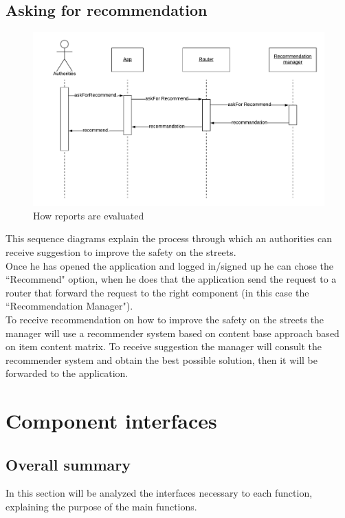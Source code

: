 \documentclass[12pt,a4paper]{report}
\begin{document}
			\subsection{Asking for recommendation}
				\begin{figure}[H]
						\includegraphics[width = \textwidth, center]{recommendation}
						\caption{How reports are evaluated}
						\label{fig: diagrams}
				\end{figure}
				This sequence diagrams explain the process through which an authorities can receive suggestion to improve
				the safety on the streets.\\
				Once he has opened the application and logged in/signed up he can chose the ``Recommend" option,
				when he does that the application send the request to a router that forward the request to the right
				component (in this case the ``Recommendation Manager").\\
				To receive recommendation on how to improve the safety on the streets the manager will use a recommender
				system based on content base approach based on item content matrix. To receive suggestion the manager
				will consult the recommender system and obtain the best possible solution, then it will be forwarded to the
				application.
		\section{Component interfaces}
			\subsection{Overall summary}
				In this section will be analyzed the interfaces necessary to each function, explaining the purpose of the main
				functions.
\end{document}
